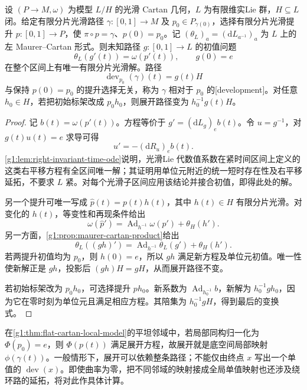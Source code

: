 \begin{proposition}\label{g1:prop:cartan-path-development}
	设 \((P\to M,\omega)\) 为模型 \(L/H\) 的光滑 Cartan 几何，\(L\) 为有限维实Lie 群，\(H\subseteq L\) 闭。给定有限分片光滑路径 \(\gamma:[0,1]\to M\) 及 \(p_0\in P_{\gamma(0)}\)，选择有限分片光滑提升 \(p:[0,1]\to P\)，使 \(\pi\circ p=\gamma\)、\(p(0)=p_0\)。记 \((\theta_L)_a=(\mathrm dL_{a^{-1}})_a\) 为 \(L\) 上的左 Maurer--Cartan 形式。则未知路径 \(g:[0,1]\to L\) 的初值问题
	\begin{equation}\label{g1:eq:cartan-development-ode}
		\theta_L(g'(t))=\omega(p'(t)),\qquad g(0)=e
	\end{equation}
	在整个区间上有唯一有限分片光滑解。路径
	\[
		\operatorname{dev}_{p_0}(\gamma)(t)=g(t)H
	\]
	与保持 \(p(0)=p_0\) 的提升选择无关，称为 \(\gamma\) 相对于 \(p_0\) 的[development]。对任意 \(h_0\in H\)，若把初始标架改成 \(p_0h_0\)，则展开路径变为 \(h_0^{-1}g(t)H\)。
\end{proposition}
\begin{proof}
	记 \(b(t)=\omega(p'(t))\)。方程等价于 \(g'=(\mathrm{d}L_g)_e b(t)\)。令 \(u=g^{-1}\)，对 \(g(t)u(t)=e\) 求导可得
	\[
		u'=-(\mathrm{d}R_u)_e b(t).
	\]
	\cref{g1:lem:right-invariant-time-ode}说明，光滑Lie 代数值系数在紧时间区间上定义的这类右平移方程有全区间唯一解；其证明用单位元附近的统一短时存在性及右平移延拓，不要求 \(L\) 紧。对每个光滑子区间应用该结论并接合初值，即得此处的解。

	另一个提升可唯一写成 \(\widehat p(t)=p(t)h(t)\)，其中 \(h(t)\in H\) 有限分片光滑。对变化的 \(h(t)\)，等变性和再现条件给出
	\[
		\omega(\widehat p')
		=\operatorname{Ad}_{h^{-1}}\omega(p')+\theta_H(h').
	\]
	另一方面，\cref{g1:prop:maurer-cartan-product}给出
	\[
		\theta_L((gh)')
		=\operatorname{Ad}_{h^{-1}}\theta_L(g')+\theta_H(h').
	\]
	若两提升初值均为 \(p_0\)，则 \(h(0)=e\)，所以 \(gh\) 满足新方程及单位元初值。唯一性使新解正是 \(gh\)，投影后 \((gh)H=gH\)，从而展开路径不变。

	若初始标架改为 \(p_0h_0\)，可选择提升 \(ph_0\)。新系数为 \(\operatorname{Ad}_{h_0^{-1}}b\)，新解为 \(h_0^{-1}gh_0\)，因为它在零时刻为单位元且满足相应方程。其陪集为 \(h_0^{-1}gH\)，得到最后的变换式。
\end{proof}

在\cref{g1:thm:flat-cartan-local-model}的平坦邻域中，若局部同构归一化为 \(\Phi(p_0)=e\)，则 \(\Phi(p(t))\) 满足展开方程，故展开就是底空间局部映射 \(\phi(\gamma(t))\)。一般情形下，展开可以依赖整条路径；不能仅由终点 \(x\) 写出一个单值的 \(\operatorname{dev}(x)\)。即使曲率为零，把不同邻域的映射接成全局单值映射也还涉及绕环路的延拓，将对此作具体计算。


